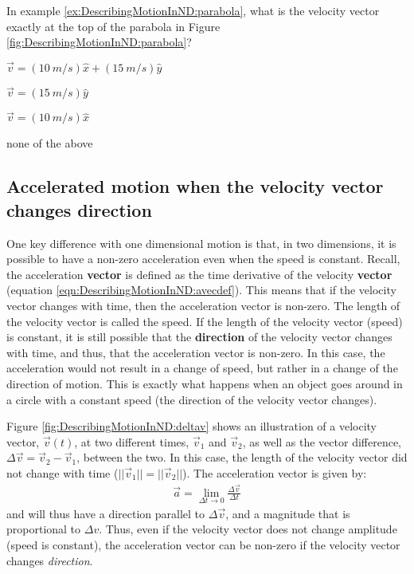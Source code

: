 \begin{checkpointMC}{In example \ref{ex:DescribingMotionInND:parabola}, what is the velocity vector exactly at the top of the parabola in Figure \ref{fig:DescribingMotionInND:parabola}?}
\item $\vec v=(\SI{10}{m/s})\hat x+(\SI{15}{m/s})\hat y$
\item $\vec v=(\SI{15}{m/s})\hat y$
\item $\vec v=(\SI{10}{m/s})\hat x$ %
\item none of the above
\end{checkpointMC}

\subsection{Accelerated motion when the velocity vector changes direction}
\label{sec:DescribingMotionInND:accvconst}
One key difference with one dimensional motion is that, in two dimensions, it is possible to have a non-zero acceleration even when the speed is constant. Recall, the acceleration \textbf{vector} is defined as the time derivative of the velocity \textbf{vector} (equation \ref{eqn:DescribingMotionInND:avecdef}). This means that if the velocity vector changes with time, then the acceleration vector is non-zero. The length of the velocity vector is called the speed. If the length of the velocity vector (speed) is constant, it is still possible that the \textbf{direction} of the velocity vector changes with time, and thus, that the acceleration vector is non-zero. In this case, the acceleration would not result in a change of speed, but rather in a change of the direction of motion. This is exactly what happens when an object goes around in a circle with a constant speed (the direction of the velocity vector changes). 

Figure \ref{fig:DescribingMotionInND:deltav} shows an illustration of a velocity vector, $\vec v(t)$, at two different times, $\vec v_1$ and $\vec v_2$, as well as the vector difference, $\Delta \vec v=\vec v_2 - \vec v_1$, between the two. In this case, the length of the velocity vector did not change with time ($||\vec v_1||=||\vec v_2||$). The acceleration vector is given by:
\begin{align*}
\vec a = \lim_{\Delta t\to 0}\frac{\Delta \vec v}{\Delta t}
\end{align*}
and will thus have a direction parallel to $\Delta \vec v$, and a magnitude that is proportional to $\Delta v$. Thus, even if the velocity vector does not change amplitude (speed is constant), the acceleration vector can be non-zero if the velocity vector changes \textit{direction}.

